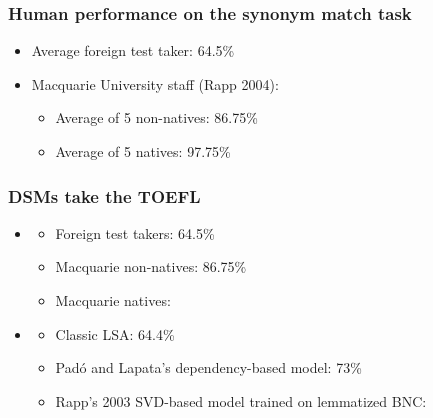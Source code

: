 \begin{frame}
  \frametitle{Human performance on the synonym match task}

  \begin{itemize}
  \item Average foreign test taker: 64.5\%
  \item Macquarie University staff (Rapp 2004):
    \begin{itemize}
    \item Average of 5 non-natives: 86.75\%
    \item Average of 5 natives: 97.75\%
    \end{itemize}

  \end{itemize}

\end{frame}


\begin{frame}
  \frametitle{DSMs take the TOEFL}
  \begin{itemize}
  \item {}
    \begin{itemize}
    \item Foreign test takers: 64.5\%
    \item Macquarie non-natives: 86.75\%
    \item Macquarie natives: 
    \end{itemize}
  \item {}
    \begin{itemize}
    \item Classic LSA: 64.4\%
    \item Padó and Lapata's dependency-based model: 73\%
    \item Rapp's 2003 SVD-based model trained on lemmatized BNC:
    \end{itemize}
  \end{itemize}
\end{frame}


